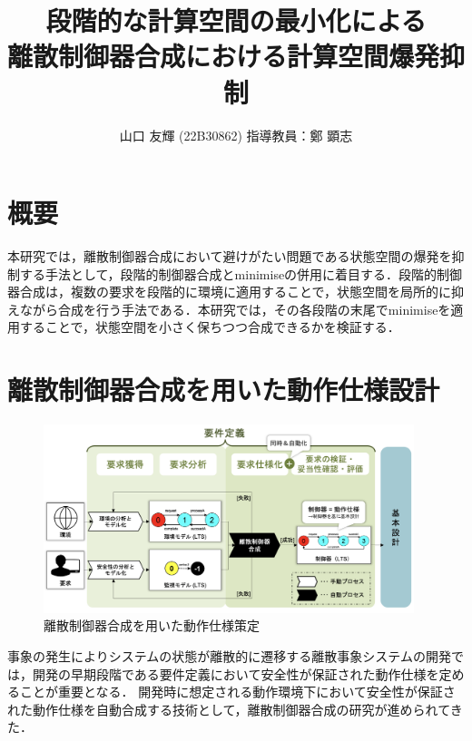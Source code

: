 \documentclass[11pt]{jarticle}
\begin{document}

\title{段階的な計算空間の最小化による\\離散制御器合成における計算空間爆発抑制}
\author{山口 友輝 (22B30862) \;\; 指導教員：鄭 顕志}
\date{\empty} %
\maketitle %
\thispagestyle{fancy}


\section{概要} 
本研究では，離散制御器合成において避けがたい問題である状態空間の爆発を抑制する手法として，段階的制御器合成とminimiseの併用に着目する．段階的制御器合成は，複数の要求を段階的に環境に適用することで，状態空間を局所的に抑えながら合成を行う手法である．本研究では，その各段階の末尾でminimiseを適用することで，状態空間を小さく保ちつつ合成できるかを検証する．


\section{離散制御器合成を用いた動作仕様設計}

\begin{figure}
  \centering
  \includegraphics[width=10.8cm]{./figures/DCS.png}
  \caption{離散制御器合成を用いた動作仕様策定}
  \label{fig:1}
\end{figure}

事象の発生によりシステムの状態が離散的に遷移する離散事象システムの開発では，開発の早期段階である要件定義において安全性が保証された動作仕様を定めることが重要となる\cite{rebok}．
開発時に想定される動作環境下において安全性が保証された動作仕様を自動合成する技術として，離散制御器合成\cite{concurrency}の研究が進められてきた．
\end{document}
